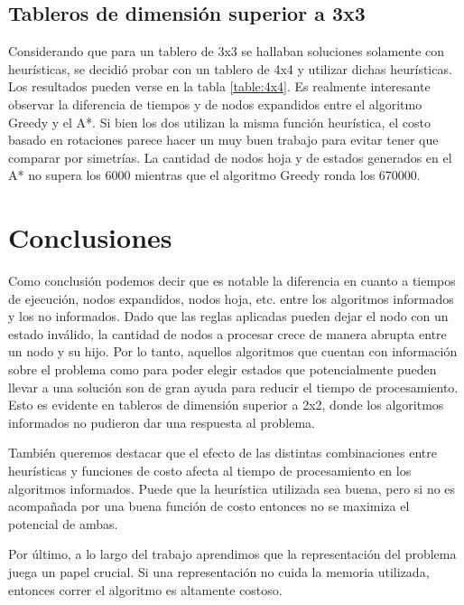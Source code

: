 \documentclass[11pt,twocolumn]{article}
\begin{document}
    \subsection{Tableros de dimensión superior a 3x3}
        \par Considerando que para un tablero de 3x3 se hallaban soluciones solamente con heurísticas, se decidió probar con un tablero de 4x4 y utilizar dichas heurísticas. Los resultados pueden verse en la tabla \ref{table:4x4}. Es realmente interesante observar la diferencia de tiempos y de nodos expandidos entre el algoritmo Greedy y el A*. Si bien los dos utilizan la misma función heurística, el costo basado en rotaciones parece hacer un muy buen trabajo para evitar tener que comparar por simetrías. La cantidad de nodos hoja y de estados generados en el A* no supera los 6000 mientras que el algoritmo Greedy ronda los 670000.

\section{Conclusiones}
    \par Como conclusión podemos decir que es notable la diferencia en cuanto a tiempos de ejecución, nodos expandidos, nodos hoja, etc. entre los algoritmos informados y los no informados. Dado que las reglas aplicadas pueden dejar el nodo con un estado inválido, la cantidad de nodos a procesar crece de manera abrupta entre un nodo y su hijo. Por lo tanto, aquellos algoritmos que cuentan con información sobre el problema como para poder elegir estados que potencialmente pueden llevar a una solución son de gran ayuda para reducir el tiempo de procesamiento. Esto es evidente en tableros de dimensión superior a 2x2, donde los algoritmos informados no pudieron dar una respuesta al problema.
    \par También queremos destacar que el efecto de las distintas combinaciones entre heurísticas y funciones de costo afecta al tiempo de procesamiento en los algoritmos informados. Puede que la heurística utilizada sea buena, pero si no es acompañada por una buena función de costo entonces no se maximiza el potencial de ambas.
    
    \par Por último, a lo largo del trabajo aprendimos que la representación del problema juega un papel crucial. Si una representación no cuida la memoria utilizada, entonces correr el algoritmo es altamente costoso. 

\clearpage
\onecolumn
\appendix
\end{document}
